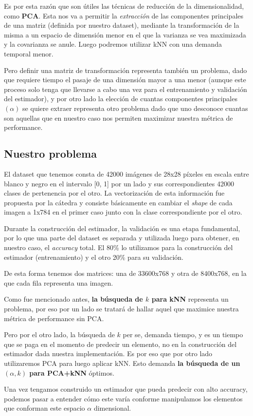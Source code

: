 Es por esta razón que son útiles las técnicas de reducción de la dimensionalidad, como \textbf{PCA}. Esta nos va a permitir la \textit{extracción} de las componentes principales de una matriz (definida por nuestro dataset), mediante la transformación de la misma a un espacio de dimensión menor en el que la varianza se vea maximizada y la covarianza se anule. Luego podremos utilizar kNN con una demanda temporal menor.

Pero definir una matriz de transformación representa también un problema, dado que requiere tiempo el pasaje de una dimensión mayor a una menor (aunque este proceso solo tenga que llevarse a cabo una vez para el entrenamiento y validación del estimador), y por otro lado la elección de cuantas componentes principales $(\alpha)$ se quiere extraer representa otro problema dado que uno desconoce cuantas son aquellas que en nuestro caso nos permiten maximizar nuestra métrica de performance.

\subsection{Nuestro problema}

El dataset que tenemos consta de 42000 imágenes de 28x28 píxeles en escala entre blanco y negro en el intervalo [0, 1] por un lado y sus correspondientes 42000 clases de pertenencia por el otro. La vectorización de esta información fue propuesta por la cátedra y consiste básicamente en cambiar el \textit{shape} de cada imagen a 1x784 en el primer caso junto con la clase correspondiente por el otro.

Durante la construcción del estimador, la validación es una etapa fundamental, por lo que una parte del dataset es separada y utilizada luego para obtener, en nuestro caso, el \textit{accuracy} total. El 80\% lo utilizamos para la construcción del estimador (entrenamiento) y el otro 20\% para su validación.

De esta forma tenemos dos matrices: una de 33600x768 y otra de 8400x768, en la que cada fila representa una imagen.

Como fue mencionado antes, \textbf{la búsqueda de $k$ para kNN} representa un problema, por eso por un lado se tratará de hallar aquel que maximice nuestra métrica de performance sin PCA.

Pero por el otro lado, la búsqueda de $k$ per se, demanda tiempo, y es un tiempo que se paga en el momento de predecir un elemento, no en la construcción del estimador dada nuestra implementación. Es por eso que por otro lado utilizaremos PCA para luego aplicar kNN. Esto demanda \textbf{la búsqueda de un $(\alpha, k)$ para PCA+kNN} óptimos.

Una vez tengamos construido un estimador que pueda predecir con alto accuracy, podemos pasar a entender cómo este varía conforme manipulamos los elementos que conforman este espacio $\alpha$ dimensional.
